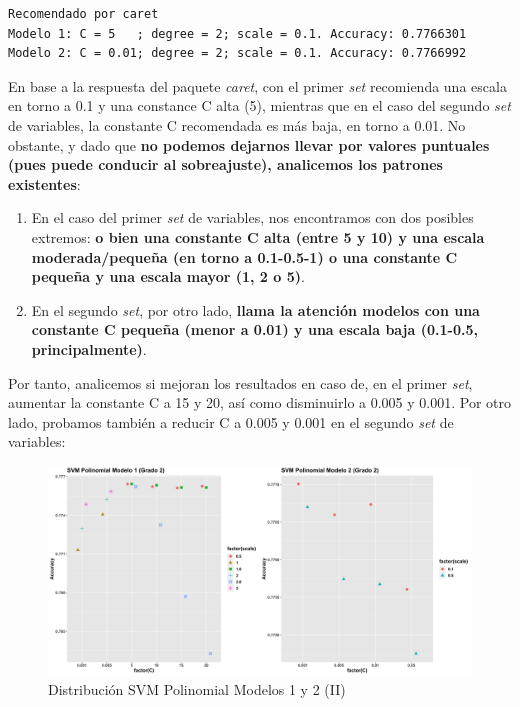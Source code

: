 \documentclass[
]{article}
\begin{document}
\begin{verbatim}
Recomendado por caret
Modelo 1: C = 5   ; degree = 2; scale = 0.1. Accuracy: 0.7766301
Modelo 2: C = 0.01; degree = 2; scale = 0.1. Accuracy: 0.7766992
\end{verbatim}

En base a la respuesta del paquete \emph{caret}, con el primer
\emph{set} recomienda una escala en torno a 0.1 y una constance C alta
(5), mientras que en el caso del segundo \emph{set} de variables, la
constante C recomendada es más baja, en torno a 0.01. No obstante, y
dado que \textbf{no podemos dejarnos llevar por valores puntuales (pues
puede conducir al sobreajuste), analicemos los patrones existentes}:

\begin{enumerate}
\def\labelenumi{\arabic{enumi}.}
\item
  En el caso del primer \emph{set} de variables, nos encontramos con dos
  posibles extremos: \textbf{o bien una constante C alta (entre 5 y 10)
  y una escala moderada/pequeña (en torno a 0.1-0.5-1) o una constante C
  pequeña y una escala mayor (1, 2 o 5)}.
\item
  En el segundo \emph{set}, por otro lado, \textbf{llama la atención
  modelos con una constante C pequeña (menor a 0.01) y una escala baja
  (0.1-0.5, principalmente)}.
\end{enumerate}

Por tanto, analicemos si mejoran los resultados en caso de, en el primer
\emph{set}, aumentar la constante C a 15 y 20, así como disminuirlo a
0.005 y 0.001. Por otro lado, probamos también a reducir C a 0.005 y
0.001 en el segundo \emph{set} de variables:

\begin{figure}[h!]

{\centering \includegraphics[width=0.99\linewidth,height=0.99\textheight,]{./charts/SVM/polinomica/svm_polinomial_parte2} 

}

\caption{Distribución SVM Polinomial Modelos 1 y 2 (II)}\label{fig:unnamed-chunk-120}
\end{figure}
\end{document}
